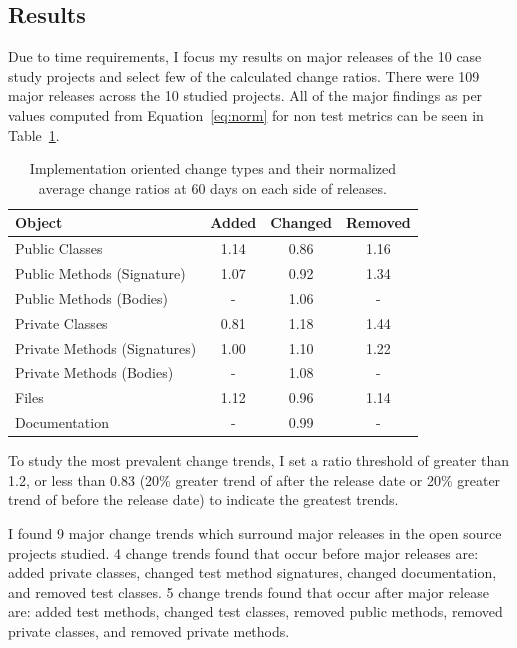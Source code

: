 \subsection{Results}
\label{sec:apie-results}

Due to time requirements, I focus my results on major releases of the 10 case study projects and select few of the calculated change ratios. 
There were 109 major releases across the 10 studied projects. All of the major findings as per values computed from Equation~\ref{eq:norm} for non test metrics
can be seen in Table~\ref{tab:apie-ratio}.

\begin{table}[ht]
\begin{center}
\tabcolsep=0.11cm
\begin{tabular}{| l | c | c | c |}
\hline
Object & Added & Changed & Removed\\
\hline
Public Classes & 1.14 & 0.86 & 1.16 \\
Public Methods (Signature) & 1.07 & 0.92 & 1.34 \\
Public Methods (Bodies) & - & 1.06 & - \\
Private Classes & 0.81 & 1.18 & 1.44 \\
Private Methods (Signatures) & 1.00 & 1.10 & 1.22 \\
Private Methods (Bodies) & - & 1.08 & - \\
Files & 1.12 & 0.96 & 1.14 \\
Documentation & - & 0.99 & - \\
\hline
\end{tabular}
\end{center}
\caption{Implementation oriented change types and their normalized average change ratios at 60 days on each side of releases. \label{tab:apie-ratio}}
\end{table}

To study the most prevalent change trends, I set a ratio threshold of greater than 1.2, or less than 0.83 (20\% greater trend of after the release date
or 20\% greater trend of before the release date) to indicate the greatest trends.

I found 9 major change trends which surround major releases in the open source
projects studied. 4 change trends found that occur before major releases are: added private classes, 
changed test method signatures, changed documentation, and removed test classes.
5 change trends found that occur after major release are: added test methods, changed test classes, removed public methods, removed
private classes, and removed private methods.


